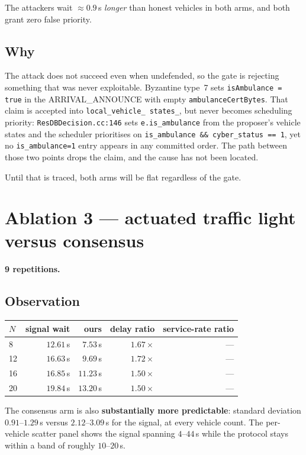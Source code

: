 \documentclass[11pt,a4paper]{article}
\newcommand{\code}[1]{\texttt{\small #1}}
\begin{document}
\noindent
The attackers wait ${\approx}0.9$\,s \emph{longer} than honest vehicles in both
arms, and both grant zero false priority.

\subsection*{Why}

The attack does not succeed even when undefended, so the gate is rejecting
something that was never exploitable. Byzantine type~7 sets
\code{isAmbulance = true} in the ARRIVAL\_ANNOUNCE with empty
\code{ambulanceCertBytes}. That claim is accepted into \code{local\_vehicle\_%
states\_}, but never becomes scheduling priority: \code{ResDBDecision.cc:146}
sets \code{e.is\_ambulance} from the proposer's vehicle states and the scheduler
prioritises on \code{is\_ambulance \&\& cyber\_status == 1}, yet no
\code{is\_ambulance=1} entry appears in any committed order. The path between
those two points drops the claim, and the cause has not been located.

Until that is traced, both arms will be flat regardless of the gate.

\section{Ablation 3 --- actuated traffic light versus consensus}

\textbf{9 repetitions.}

\subsection*{Observation}

\begin{center}
\begin{tabular}{lrrrr}
\toprule
$N$ & signal wait & ours & delay ratio & service-rate ratio \\
\midrule
8  & $12.61$\,s & $7.53$\,s & $1.67\times$ & --- \\
12 & $16.63$\,s & $9.69$\,s & $1.72\times$ & --- \\
16 & $16.85$\,s & $11.23$\,s & $1.50\times$ & --- \\
20 & $19.84$\,s & $13.20$\,s & $1.50\times$ & --- \\
\bottomrule
\end{tabular}
\end{center}

\noindent
The consensus arm is also \textbf{substantially more predictable}: standard
deviation $0.91$--$1.29$\,s versus $2.12$--$3.09$\,s for the signal, at every
vehicle count. The per-vehicle scatter panel shows the signal spanning
$4$--$44$\,s while the protocol stays within a band of roughly $10$--$20$\,s.
\end{document}
